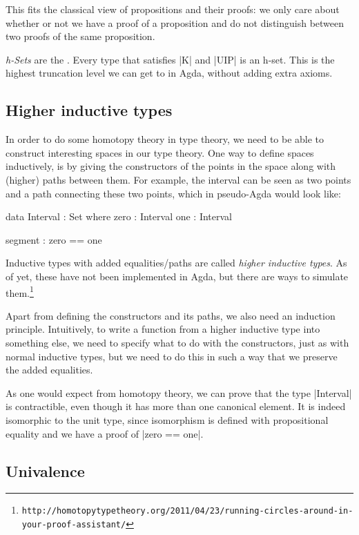This fits the classical view of propositions and their proofs: we only
care about whether or not we have a proof of a proposition and do not
distinguish between two proofs of the same proposition.

\emph{h-Sets} are the . Every type that satisfies |K| and
|UIP| is an h-set. This is the highest truncation level we can get to
in Agda, without adding extra axioms.

\subsection{Higher inductive types}
\label{sec:hit}

In order to do some homotopy theory in type theory, we need to be able
to construct interesting spaces in our type theory. One way to define
spaces inductively, is by giving the constructors of the points in the
space along with (higher) paths between them. For example, the
interval can be seen as two points and a path connecting these two
points, which in pseudo-Agda would look like:

\begin{code}
  data Interval : Set where
    zero  : Interval
    one   : Interval

    segment : zero == one
\end{code}

Inductive types with added equalities/paths are called \emph{higher
  inductive types}. As of yet, these have not been implemented in
Agda, but there are ways to simulate
them.\footnote{\verb+http://homotopytypetheory.org/2011/04/23/running-circles-around-in-your-proof-assistant/+}

Apart from defining the constructors and its paths, we also need an
induction principle. Intuitively, to write a function from a higher
inductive type into something else, we need to specify what to do with
the constructors, just as with normal inductive types, but we need to
do this in such a way that we preserve the added equalities. 

As one would expect from homotopy theory, we can prove that the type
|Interval| is contractible, even though it has more than one canonical
element. It is indeed isomorphic to the unit type, since isomorphism
is defined with propositional equality and we have a proof of |zero ==
one|.

\subsection{Univalence}
\label{sec:univalence}


